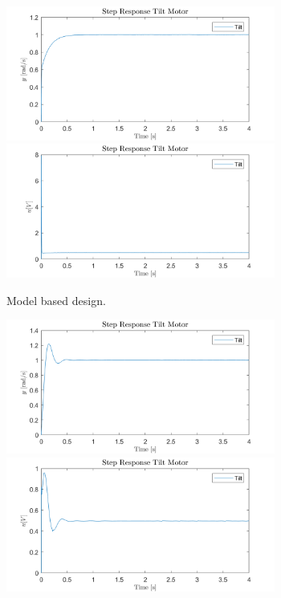 \documentclass[../../main.tex]{subfiles}
\begin{document}
\begin{figure}[h]
\begin{subfigure}{0.48\textwidth}
    \includegraphics[width = 0.97\textwidth]{Sections/System_Design/Images/vel_polePlace_step_y_Sat.png}
     \includegraphics[width = 0.97\textwidth]{Sections/System_Design/Images/vel_polePlace_step_u_Sat.png}
    \caption{Model based design.}
    \label{fig:step_vel_model}
\end{subfigure}\quad
\begin{subfigure}{0.48\textwidth}
    \includegraphics[width = 0.97\textwidth]{Sections/System_Design/Images/vel_ZN_step_y_Sat.png}
    \includegraphics[width = 0.97\textwidth]{Sections/System_Design/Images/vel_ZN_step_u_Sat.png}

\end{subfigure}
\end{figure}
\end{document}

